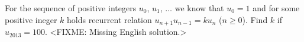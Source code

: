 \problem{}
For the sequence of positive integers $u_0$, $u_1$, $\ldots$ we know that
$u_0 = 1$ and for some positive ineger $k$ holds recurrent relation $u_{n+1} u_{n-1} = k u_n$ ($n \geq 0$).
Find $k$ if $u_{2013} = 100$.
\solution
<FIXME: Missing English solution.>
\endproblem
